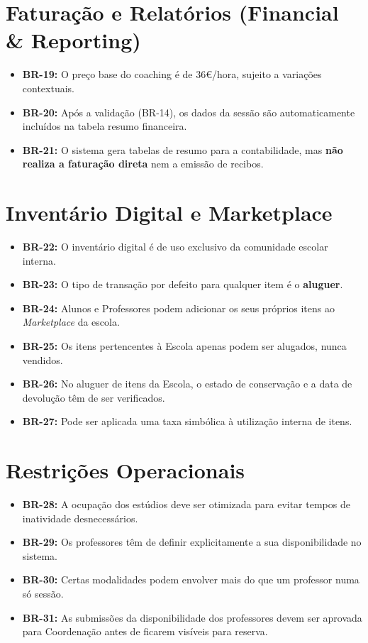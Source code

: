 \documentclass[12pt,a4paper]{report}
\begin{document}
\section{Faturação e Relatórios (Financial \& Reporting)}
\begin{itemize}
    \item \textbf{BR-19:} O preço base do coaching é de 36€/hora, sujeito a variações contextuais.
    \item \textbf{BR-20:} Após a validação (BR-14), os dados da sessão são automaticamente incluídos na tabela resumo financeira.
    \item \textbf{BR-21:} O sistema gera tabelas de resumo para a contabilidade, mas \textbf{não realiza a faturação direta} nem a emissão de recibos.
\end{itemize}

\section{Inventário Digital e Marketplace}
\begin{itemize}
    \item \textbf{BR-22:} O inventário digital é de uso exclusivo da comunidade escolar interna.
    \item \textbf{BR-23:} O tipo de transação por defeito para qualquer item é o \textbf{aluguer}.
    \item \textbf{BR-24:} Alunos e Professores podem adicionar os seus próprios itens ao \textit{Marketplace} da escola.
    \item \textbf{BR-25:} Os itens pertencentes à Escola apenas podem ser alugados, nunca vendidos.
    \item \textbf{BR-26:} No aluguer de itens da Escola, o estado de conservação e a data de devolução têm de ser verificados.
    \item \textbf{BR-27:} Pode ser aplicada uma taxa simbólica à utilização interna de itens.
\end{itemize}

\section{Restrições Operacionais}
\begin{itemize}
    \item \textbf{BR-28:} A ocupação dos estúdios deve ser otimizada para evitar tempos de inatividade desnecessários.
    \item \textbf{BR-29:} Os professores têm de definir explicitamente a sua disponibilidade no sistema.
    \item \textbf{BR-30:} Certas modalidades podem envolver mais do que um professor numa só sessão.
    \item \textbf{BR-31:} As submissões da disponibilidade dos professores devem ser aprovada para Coordenação antes de ficarem visíveis para reserva.
\end{itemize}
\end{document}
